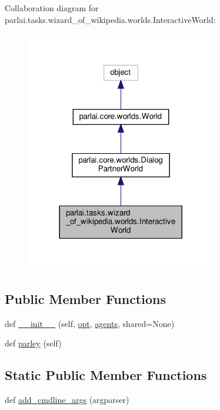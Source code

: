 Collaboration diagram for parlai.\+tasks.\+wizard\+\_\+of\+\_\+wikipedia.\+worlds.\+Interactive\+World\+:\nopagebreak
\begin{figure}[H]
\begin{center}
\leavevmode
\includegraphics[width=236pt]{d6/d5d/classparlai_1_1tasks_1_1wizard__of__wikipedia_1_1worlds_1_1InteractiveWorld__coll__graph}
\end{center}
\end{figure}
\subsection*{Public Member Functions}
\begin{DoxyCompactItemize}
\item 
def \hyperlink{classparlai_1_1tasks_1_1wizard__of__wikipedia_1_1worlds_1_1InteractiveWorld_a17330f1fd256bd53eafea1c7e119d77d}{\+\_\+\+\_\+init\+\_\+\+\_\+} (self, \hyperlink{classparlai_1_1core_1_1worlds_1_1World_a3640d92718acd3e6942a28c1ab3678bd}{opt}, \hyperlink{classparlai_1_1core_1_1worlds_1_1DialogPartnerWorld_a04185d1d55ca86c96c796f12f2226fc9}{agents}, shared=None)
\item 
def \hyperlink{classparlai_1_1tasks_1_1wizard__of__wikipedia_1_1worlds_1_1InteractiveWorld_afcda29202fc3fd773522edbd3c40e4a4}{parley} (self)
\end{DoxyCompactItemize}
\subsection*{Static Public Member Functions}
\begin{DoxyCompactItemize}
\item 
def \hyperlink{classparlai_1_1tasks_1_1wizard__of__wikipedia_1_1worlds_1_1InteractiveWorld_abff35233d98cd0a20cd49fef57f0f0bd}{add\+\_\+cmdline\+\_\+args} (argparser)
\end{DoxyCompactItemize}

